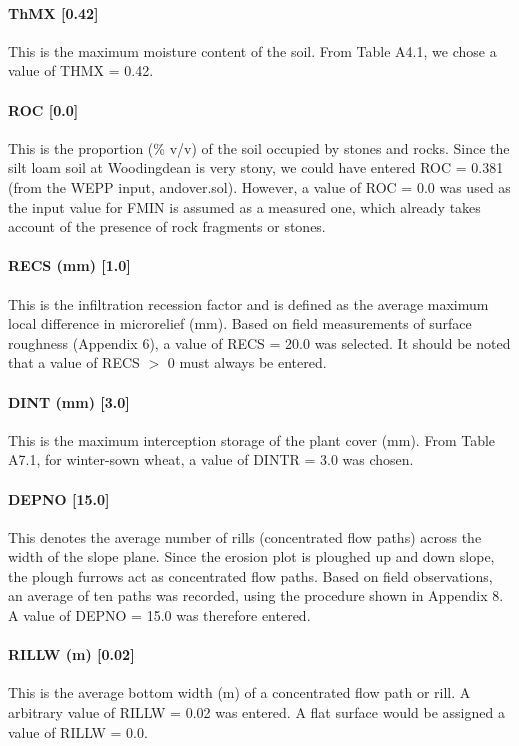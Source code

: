\paragraph{ThMX [0.42]}
This is the maximum moisture content of the soil. From Table A4.1, we chose a
value of THMX = 0.42.
 
\paragraph{ROC [0.0]}
This is the proportion (\% v/v) of the soil occupied by stones and rocks. Since
the silt loam soil at Woodingdean is very stony, we could have entered ROC =
0.381 (from the WEPP input, andover.sol). However, a value of ROC = 0.0 was used
as the input value for FMIN is assumed as a measured one, which already takes
account of the presence of rock fragments or stones.
 
\paragraph{RECS (mm) [1.0]}
This is the infiltration recession factor and is defined as the average maximum
local difference in microrelief (mm). Based on field measurements of surface
roughness (Appendix 6), a value of RECS = 20.0 was selected.
It should be noted that a value of RECS $>$ 0 must always be entered.
 
\paragraph{DINT (mm) [3.0]}
This is the maximum interception storage of the plant cover (mm). From Table
A7.1, for winter-sown wheat, a value of DINTR = 3.0 was chosen.
 
\paragraph{DEPNO [15.0]}
This denotes the average number of rills (concentrated flow paths) across the
width of the slope plane. Since the erosion plot is ploughed up and down slope,
the plough furrows act as concentrated flow paths. Based on field observations,
an average of ten paths was recorded, using the procedure shown in Appendix 8. A
value of DEPNO = 15.0 was therefore entered.
 
\paragraph{RILLW (m) [0.02]}
This is the average bottom width (m) of a concentrated flow path or rill. A
arbitrary value of RILLW = 0.02 was entered.
A flat surface would be assigned a value of RILLW = 0.0.
 
